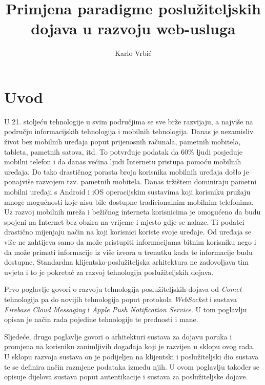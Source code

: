 \documentclass[times, utf8, zavrsni]{fer}
\begin{document}
\title{Primjena paradigme poslužiteljskih dojava u razvoju web-usluga}
\author{Karlo Vrbić}

\maketitle

\zahvala{}

\tableofcontents
\listoffigures

\chapter{Uvod}

U 21. stoljeću tehnologije u svim područjima se sve brže razvijaju, a najviše na području informacijskih tehnologija i mobilnih tehnologija. Danas je nezamisliv život bez mobilnih uređaja poput prijenosnih računala, pametnih mobitela, tableta, pametnih satova, itd. To potvrđuje podatak da 60\% ljudi posjeduje mobilni telefon i da danas većina ljudi Internetu pristupa pomoću mobilnih uređaja. Do tako drastičnog porasta broja korisnika mobilnih uređaja došlo je ponajviše razvojem tzv. pametnih mobitela. Danas tržištem dominiraju pametni mobilni uređaji s Android i iOS operacijskim sustavima koji korisniku pružaju mnoge mogućnosti koje nisu bile dostupne tradicionalnim mobilnim telefonima. Uz razvoj mobilnih mreža i bežičnog interneta korisnicima je omogućeno da budu spojeni na Internet bez obzira na vrijeme i mjesto gdje se nalaze. Ti podatci drastično mijenjaju način na koji korisnici koriste svoje uređaje. Od uređaja se više ne zahtijeva samo da može pristupiti informacijama bitnim korisniku nego i da može primati informacije iz više izvora u trenutku kada te informacije budu dostupne. Standardna klijentsko-poslužiteljska arhitektura ne zadovoljava tim uvjeta i to je pokretač za razvoj tehnologija poslužiteljskih dojava.

Prvo poglavlje govori o razvoju tehnologija poslužiteljskih dojava od {\em Comet} tehnologija pa do novijih tehnologija poput protokola {\em WebSocket} i sustava {\em Firebase Cloud Messaging} i {\em Apple Push Notification Service}. U tom poglavlju opisan je način rada pojedine tehnologije te prednosti i mane.

Sljedeće, drugo poglavlje govori o arhitekturi sustava za dojavu poruka i promjena na korisniku zanimljivih događaja koji je razvijen u sklopu ovog rada. U sklopu razvoja sustava on je podijeljen na klijentski i poslužiteljski dio sustava te se definira način razmjene podataka između njih. U ovom poglavlju također se opisuje dijelova sustava poput autentikacije i sustava za poslužiteljske dojave.
\end{document}
